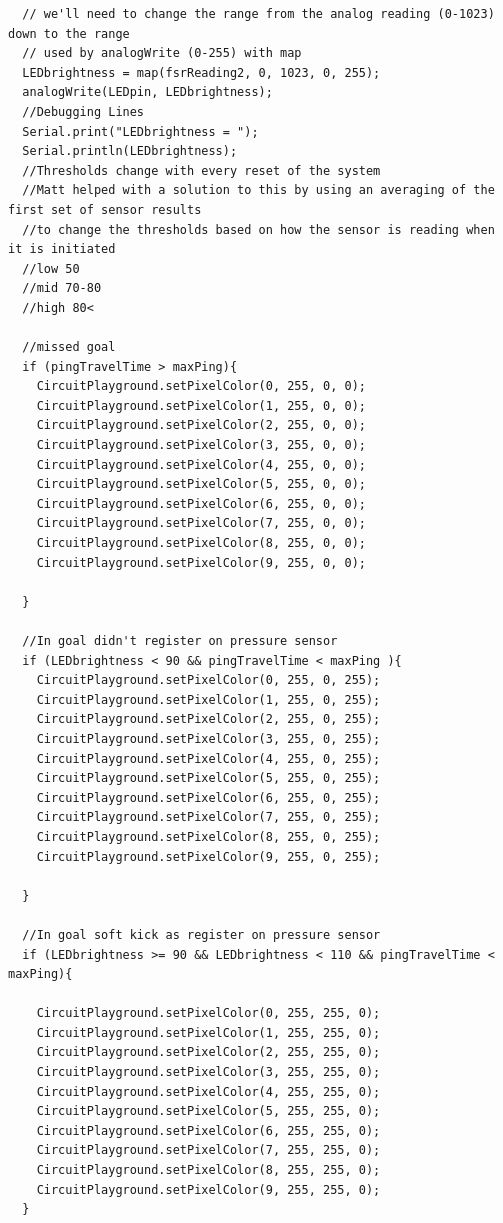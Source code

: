 \documentclass[12pt]{article}
\begin{document}
\begin{verbatim}
  // we'll need to change the range from the analog reading (0-1023) down to the range
  // used by analogWrite (0-255) with map
  LEDbrightness = map(fsrReading2, 0, 1023, 0, 255);
  analogWrite(LEDpin, LEDbrightness);
  //Debugging Lines
  Serial.print("LEDbrightness = ");
  Serial.println(LEDbrightness);
  //Thresholds change with every reset of the system
  //Matt helped with a solution to this by using an averaging of the first set of sensor results
  //to change the thresholds based on how the sensor is reading when it is initiated
  //low 50
  //mid 70-80
  //high 80<

  //missed goal
  if (pingTravelTime > maxPing){
    CircuitPlayground.setPixelColor(0, 255, 0, 0);
    CircuitPlayground.setPixelColor(1, 255, 0, 0);
    CircuitPlayground.setPixelColor(2, 255, 0, 0);
    CircuitPlayground.setPixelColor(3, 255, 0, 0);
    CircuitPlayground.setPixelColor(4, 255, 0, 0);
    CircuitPlayground.setPixelColor(5, 255, 0, 0);
    CircuitPlayground.setPixelColor(6, 255, 0, 0);
    CircuitPlayground.setPixelColor(7, 255, 0, 0);
    CircuitPlayground.setPixelColor(8, 255, 0, 0);
    CircuitPlayground.setPixelColor(9, 255, 0, 0);
    
  }

  //In goal didn't register on pressure sensor
  if (LEDbrightness < 90 && pingTravelTime < maxPing ){
    CircuitPlayground.setPixelColor(0, 255, 0, 255);
    CircuitPlayground.setPixelColor(1, 255, 0, 255);
    CircuitPlayground.setPixelColor(2, 255, 0, 255);
    CircuitPlayground.setPixelColor(3, 255, 0, 255);
    CircuitPlayground.setPixelColor(4, 255, 0, 255);
    CircuitPlayground.setPixelColor(5, 255, 0, 255);
    CircuitPlayground.setPixelColor(6, 255, 0, 255);
    CircuitPlayground.setPixelColor(7, 255, 0, 255);
    CircuitPlayground.setPixelColor(8, 255, 0, 255);
    CircuitPlayground.setPixelColor(9, 255, 0, 255);
  
  }

  //In goal soft kick as register on pressure sensor
  if (LEDbrightness >= 90 && LEDbrightness < 110 && pingTravelTime < maxPing){
  
    CircuitPlayground.setPixelColor(0, 255, 255, 0);
    CircuitPlayground.setPixelColor(1, 255, 255, 0);
    CircuitPlayground.setPixelColor(2, 255, 255, 0);
    CircuitPlayground.setPixelColor(3, 255, 255, 0);
    CircuitPlayground.setPixelColor(4, 255, 255, 0);
    CircuitPlayground.setPixelColor(5, 255, 255, 0);
    CircuitPlayground.setPixelColor(6, 255, 255, 0);
    CircuitPlayground.setPixelColor(7, 255, 255, 0);
    CircuitPlayground.setPixelColor(8, 255, 255, 0);
    CircuitPlayground.setPixelColor(9, 255, 255, 0);
  }


\end{verbatim}
\end{document}
